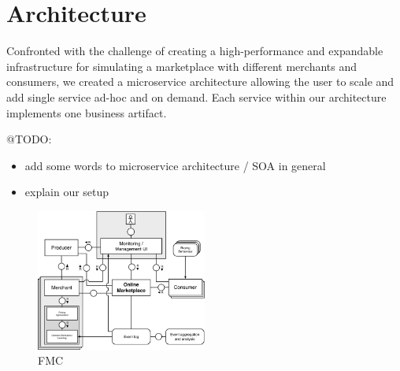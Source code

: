 \section{Architecture}
\label{sec:Architecture}
Confronted with the challenge of creating a high-performance and expandable infrastructure for simulating a marketplace with different merchants and consumers, we created a microservice architecture allowing the user to scale and add single service ad-hoc and on demand. Each service within our architecture implements one business artifact.


@TODO:

\begin{itemize}
\item add some words to microservice architecture / SOA in general
\item explain our setup
\end{itemize}

%
\begin{figure}[h]
    \centering
    \includegraphics[width=0.5\textwidth]{images/fmc.png}
    \caption{FMC}
    \label{fig:fmc}
\end{figure}
%